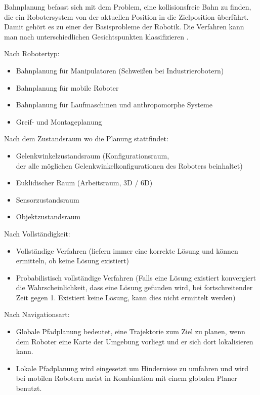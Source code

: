 Bahnplanung befasst sich mit dem Problem, eine kollisionsfreie Bahn zu finden, die ein Robotersystem von der aktuellen Position in die Zielposition überführt.
Damit gehört es zu einer der Basisprobleme der Robotik.
Die Verfahren kann man nach unterschiedlichen Gesichtspunkten klassifizieren \cite{rob1}.

Nach Robotertyp:
\begin{itemize}
\item Bahnplanung für Manipulatoren (\zB Schweißen bei Industrierobotern)
\item Bahnplanung für mobile Roboter
\item Bahnplanung für Laufmaschinen und anthropomorphe Systeme
\item Greif- und Montageplanung
\end{itemize}

Nach dem Zustandsraum wo die Planung stattfindet:
\begin{itemize}
\item Gelenkwinkelzustandsraum (Konfigurationsraum,\\ der alle möglichen
Gelenkwinkelkonfigurationen des Roboters beinhaltet)
\item Euklidischer Raum (Arbeitsraum, 3D / 6D)
\item Sensorzustandsraum
\item Objektzustandsraum
\end{itemize}

Nach Vollständigkeit:
\begin{itemize}
\item Vollständige Verfahren (liefern immer eine korrekte Lösung und können ermitteln, ob keine Lösung existiert)
\item Probabilistisch vollständige Verfahren (Falls eine Lösung existiert konvergiert die Wahrscheinlichkeit, dass eine Lösung gefunden wird, bei fortschreitender Zeit gegen 1. Existiert keine Lösung, kann dies nicht ermittelt werden)
\end{itemize}

Nach Navigationsart:
\begin{itemize}
\item Globale Pfadplanung bedeutet, eine Trajektorie zum Ziel zu planen, wenn dem Roboter eine Karte der Umgebung vorliegt und er sich dort lokalisieren kann.
\item Lokale Pfadplanung wird eingesetzt um Hindernisse zu umfahren und wird bei mobilen Robotern meist in Kombination mit einem globalen Planer benutzt. 
\end{itemize}

